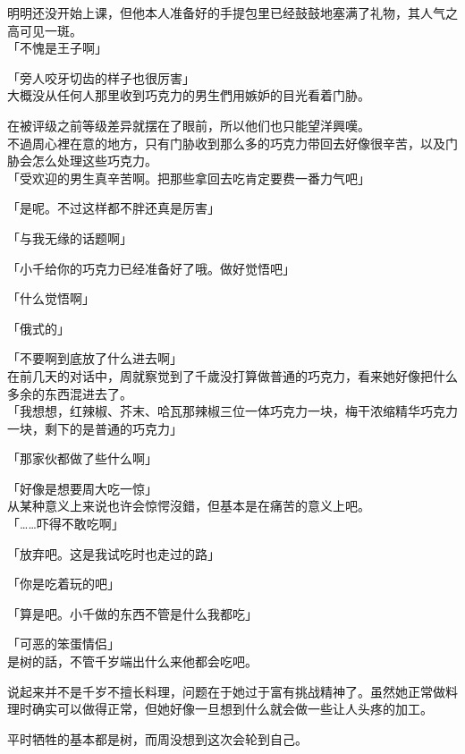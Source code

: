 明明还没开始上课，但他本人准备好的手提包里已经鼓鼓地塞满了礼物，其人气之高可见一斑。\\

「不愧是王子啊」

「旁人咬牙切齿的样子也很厉害」\\

大概没从任何人那里收到巧克力的男生們用嫉妒的目光看着门胁。

在被评级之前等级差异就摆在了眼前，所以他们也只能望洋興嘆。\\

不過周心裡在意的地方，只有门胁收到那么多的巧克力带回去好像很辛苦，以及门胁会怎么处理这些巧克力。\\

「受欢迎的男生真辛苦啊。把那些拿回去吃肯定要费一番力气吧」

「是呢。不过这样都不胖还真是厉害」

「与我无缘的话题啊」

「小千给你的巧克力已经准备好了哦。做好觉悟吧」

「什么觉悟啊」

「俄式的」

「不要啊到底放了什么进去啊」\\

在前几天的对话中，周就察觉到了千歲没打算做普通的巧克力，看来她好像把什么多余的东西混进去了。\\

「我想想，红辣椒、芥末、哈瓦那辣椒三位一体巧克力一块，梅干浓缩精华巧克力一块，剩下的是普通的巧克力」

「那家伙都做了些什么啊」

「好像是想要周大吃一惊」\\

从某种意义上来说也许会惊愕沒錯，但基本是在痛苦的意义上吧。\\

「……吓得不敢吃啊」

「放弃吧。这是我试吃时也走过的路」

「你是吃着玩的吧」

「算是吧。小千做的东西不管是什么我都吃」

「可恶的笨蛋情侣」\\

是树的話，不管千岁端出什么来他都会吃吧。

说起来并不是千岁不擅长料理，问题在于她过于富有挑战精神了。虽然她正常做料理时确实可以做得正常，但她好像一旦想到什么就会做一些让人头疼的加工。

平时牺牲的基本都是树，而周没想到这次会轮到自己。\\

